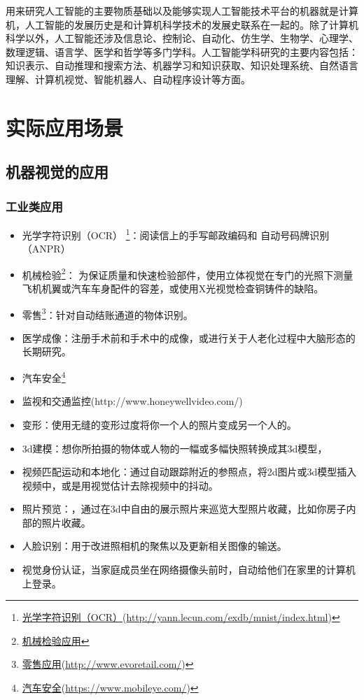 {用来研究人工智能的主要物质基础以及能够实现人工智能技术平台的机器就是计算机，人工智能的发展历史是和计算机科学技术的发展史联系在一起的。除了计算机科学以外，人工智能还涉及信息论、控制论、自动化\citep{.f,.2012}、仿生学、生物学\citep{.2017b}、心理学、数理逻辑、语言学、医学和哲学等多门学科。人工智能学科研究的主要内容包括：知识表示、自动推理和搜索方法、机器学习和知识获取、知识处理系统、自然语言理解、计算机视觉、智能机器人\citep{.2018c,.2010}、自动程序设计等方面。

\chapter{实际应用场景}
\section{机器视觉的应用}


\subsection{工业类应用 }
\begin{itemize}
\item{光学字符识别（OCR） \footnote{\href{http://yann.lecun.com/exdb/mnist/index.html}{光学字符识别（OCR）}(\url{http://yann.lecun.com/exdb/mnist/index.html})}：阅读信上的手写邮政编码和
		自动号码牌识别（ANPR）}
\item{
	机械检验\footnote{\href{
			https://www.hexagonmi.com/about-us/about-hexagon-manufacturing-intelligence/our-history/hexagon-metrology-white-light-systems }{机械检验应用}}：
		为保证质量和快速检验部件，使用立体视觉在专门的光照下测量飞机机翼或汽车车身配件的容差，或使用X光视觉检查铜铸件的缺陷。} 
\item 零售\footnote{\href{http://www.evoretail.com/}{零售应用}(\url{http://www.evoretail.com/})}：针对自动结账通道的物体识别。 
\item 医学成像：注册手术前和手术中的成像，或进行关于人老化过程中大脑形态的长期研究。
\item 汽车安全\footnote{\href{https://www.mobileye.com//}{汽车安全}(\url{https://www.mobileye.com/})}
\item 监视和交通监控(http://www.honeywellvideo.com/)
\item 变形：使用无缝的变形过度将你一个人的照片变成另一个人的。
\item 3d建模：想你所拍摄的物体或人物的一幅或多幅快照转换成其3d模型\citep{.2016}，
\item 视频匹配运动和本地化：通过自动跟踪附近的参照点，将2d图片或3d模型插入视频中，或是用视觉估计去除视频中的抖动。
\item 照片预览：，通过在3d中自由的展示照片来巡览大型照片收藏，比如你房子内部的照片收藏。
\item 人脸识别：用于改进照相机的聚焦以及更新相关图像的输送。
\item 视觉身份认证，当家庭成员坐在网络摄像头前时，自动给他们在家里的计算机上登录。


\end{itemize}}
